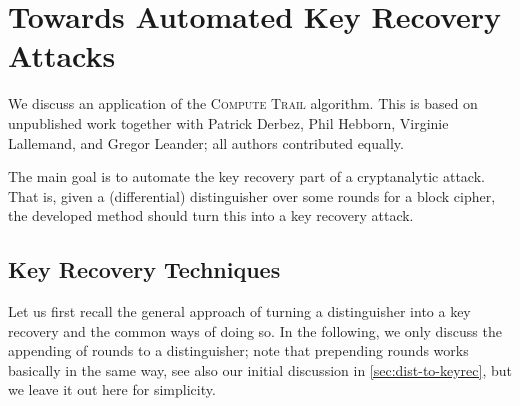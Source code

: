 \chapter{Towards Automated Key Recovery Attacks}\label{ch:key_rec}

\hspace{1.5em}
We discuss an application of the \textsc{Compute Trail} algorithm.
This is based on unpublished work together with Patrick Derbez, Phil Hebborn, Virginie Lallemand, and Gregor Leander; all authors contributed equally.

The main goal is to automate the key recovery part of a cryptanalytic attack.
That is, given a (differential) distinguisher over some rounds for a block cipher, the developed method should turn this into a key recovery attack.

\section{Key Recovery Techniques}
Let us first recall the general approach of turning a distinguisher into a key recovery and the common ways of doing so.
In the following, we only discuss the appending of rounds to a distinguisher; note that prepending rounds works basically in the same way, see also our initial discussion in \cref{sec:dist-to-keyrec}, but we leave it out here for simplicity.

